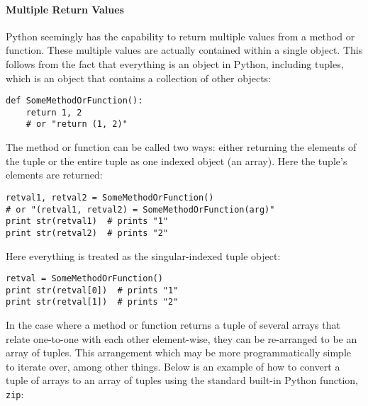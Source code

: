 \documentclass[12pt]{report} %
\begin{document}
\begin{appendices}
\paragraph{Multiple Return Values}\label{sec:PythonMultipleReturnValues}

Python seemingly has the capability to return multiple values from a method or
function. These multiple values are actually contained within a single object.
This follows from the fact that everything is an object in Python, including
tuples, which is an object that contains a collection of other objects:

\begin{center}\begin{minipage}{.95\linewidth}\begin{lstlisting}
def SomeMethodOrFunction():
    return 1, 2
    # or "return (1, 2)"
\end{lstlisting}\end{minipage}\end{center}

The method or function can be called two ways: either returning the elements of
the tuple or the entire tuple as one indexed object (an array). Here the
tuple's elements are returned:

\begin{center}\begin{minipage}{.95\linewidth}\begin{lstlisting}
retval1, retval2 = SomeMethodOrFunction()
# or "(retval1, retval2) = SomeMethodOrFunction(arg)"
print str(retval1)  # prints "1"
print str(retval2)  # prints "2"
\end{lstlisting}\end{minipage}\end{center}

Here everything is treated as the singular-indexed tuple object:

\begin{center}\begin{minipage}{.95\linewidth}\begin{lstlisting}
retval = SomeMethodOrFunction()
print str(retval[0])  # prints "1"
print str(retval[1])  # prints "2"
\end{lstlisting}\end{minipage}\end{center}

In the case where a method or function returns a tuple of several arrays that
relate one-to-one with each other element-wise, they can be re-arranged to be an
array of tuples.  This arrangement which may be more programmatically simple to iterate over,
among other things. Below is an example of how to convert a tuple of arrays to
an array of tuples using the standard built-in Python function, \texttt{zip}:


\end{appendices}
\end{document}
